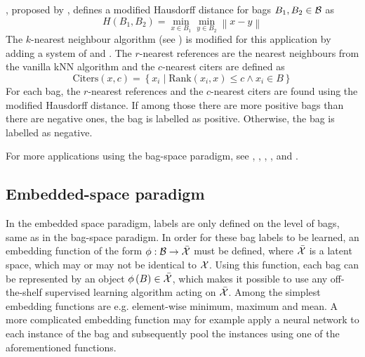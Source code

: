 , proposed by \cite{wang_solving_2000}, defines a modified Hausdorff distance for bags \( B_1, B_2 \in \mathcal{B} \) as
\[ H \left( B_1, B_2 \right) = \min_{x \in B_1} \min_{y \in B_2} \left\lVert x - y \right\rVert \]
The \( k \)-nearest neighbour algorithm (see \cite{dasarathy_nearest_1991}) is modified for this application by adding a system of  and . The \( r \)-nearest references are the nearest neighbours from the vanilla kNN algorithm and the \( c \)-nearest citers are defined as
\[ \mathrm{Citers} \left( x, c \right) = \left\{ x_i \middle| \mathrm{Rank} \left( x_i, x \right) \leq c \wedge x_i \in B \right\} \]
For each bag, the \( r \)-nearest references and the \( c \)-nearest citers are found using the modified Hausdorff distance. If among those there are more positive bags than there are negative ones, the bag is labelled as positive. Otherwise, the bag is labelled as negative.

For more applications using the bag-space paradigm, see \cite{wang_solving_2000}, \cite{kwok_marginalized_2007}, \cite{gartner_multi-instance_2002}, \cite{haussler_convolution_1999}, \cite{zhou_multi-instance_2008} and \cite{muandet_learning_2012}.

\subsection{Embedded-space paradigm}\label{sec:embedded-space-paradigm}
In the embedded space paradigm, labels are only defined on the level of bags, same as in the bag-space paradigm. In order for these bag labels to be learned, an embedding function of the form \( \phi : \mathcal{B} \to \bar{\mathcal{X}} \) must be defined, where \( \bar{\mathcal{X}} \) is a latent space, which may or may not be identical to \( \mathcal{X} \). Using this function, each bag can be represented by an object \( \phi \left( B \right) \in \bar{\mathcal{X}} \), which makes it possible to use any off-the-shelf supervised learning algorithm acting on \( \bar{\mathcal{X}} \). Among the simplest embedding functions are e.g. element-wise minimum, maximum and mean. A more complicated embedding function may for example apply a neural network to each instance of the bag and subsequently pool the instances using one of the aforementioned functions.

